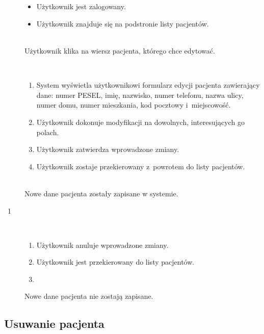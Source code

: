 \documentclass[11pt]{aghdpl}
\begin{document}
	\begin{description}
		\item[\useCaseAktor] \hfill \\
			\useCaseUzytkownik
		\item[\useCaseWarPocz] \hfill \\
			\begin{itemize}
				\item Użytkownik jest zalogowany.
				\item Użytkownik znajduje się na podstronie listy pacjentów.
			\end{itemize}
		\item[\useCaseZdarzInicj] \hfill \\
			Użytkownik klika na wiersz pacjenta, którego chce edytować.
		\item[\useCaseScenBaz] \hfill \\ 
			\begin{enumerate}
				\item System wyświetla użytkownikowi formularz edycji pacjenta zawierający dane: numer PESEL, imię, nazwisko, numer telefonu, nazwa ulicy, numer domu, numer mieszkania, kod pocztowy i~miejscowość.
				\item Użytkownik dokonuje modyfikacji na dowolnych, interesujących go polach.
				\item Użytkownik zatwierdza wprowadzone zmiany.
				\item Użytkownik zostaje przekierowany z~powrotem do listy pacjentów.
			\end{enumerate}
		\item[\useCaseWarKonc] \hfill \\ 
			Nowe dane pacjenta zostały zapisane w systemie.
		\item[\useCaseWyjatek~1] \hfill \\
			\begin{enumerate}[label=3a\arabic*.]
				\item Użytkownik anuluje wprowadzone zmiany.
				\item Użytkownik jest przekierowany do listy pacjentów.
				\item \useCaseEnd
			\end{enumerate}
			Nowe dane pacjenta nie zostają zapisane.
	\end{description}
	
\subsection{Usuwanie pacjenta}
\end{document}
